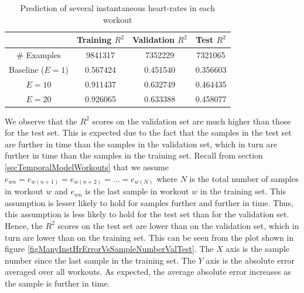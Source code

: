 \documentclass{acm_proc_article-sp}
\begin{document}
\begin{table}[H]
\centering
\begin{tabular}{|c|c|c|c|} \hline
& Training $R^2$ & Validation $R^2$ & Test $R^2$ \\ \hline
\# Examples &  9841317 & 7352229 & 7321065 \\ \hline
Baseline ($E = 1$) & 0.567424 & 0.451540 & 0.356603 \\ \hline
$E = 10$ & 0.911437 & 0.632749 & 0.464435 \\ \hline
$E = 20$ &  0.926065 & 0.633388 & 0.458077 \\ \hline
\end{tabular}
\caption{Prediction of several instantaneous heart-rates in each workout}
\label{tableInstManyHr}
\end{table}

We observe that the $R^2$ scores on the validation set are much higher than those for the test set. This is expected due to the fact that the samples in the test set are further in time than the samples in the validation set, which in turn are further in time than the samples in the training set. Recall from section \ref{secTemporalModelWorkouts} that we assume $e_{wn} = e_{w(n+1)} = e_{w(n+2)} = ... = e_{w(N)}$ where $N$ is the total number of samples in workout $w$ and $e_{wn}$ is the last sample in workout $w$ in the training set. This assumption is lesser likely to hold for samples further and further in time. Thus, this assumption is less likely to hold for the test set than for the validation set. Hence, the $R^2$ scores on the test set are lower than on the validation set, which in turn are lower than on the training set. This can be seen from the plot shown in figure \ref{figManyInstHrErrorVsSampleNumberValTest}. The $X$ axis is the sample number since the last sample in the training set. The $Y$ axis is the absolute error averaged over all workouts. As expected, the average absolute error increases as the sample is further in time.
\end{document}
